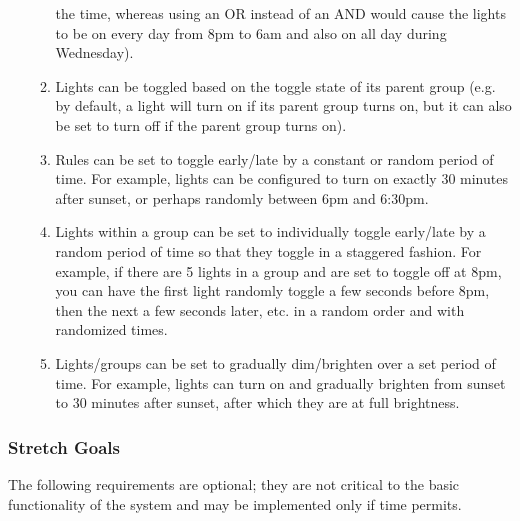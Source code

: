 \begin{enumerate}
\begin{enumerate}
                the time, whereas using an OR instead of an AND would cause the
                lights to be on every day from 8pm to 6am and also on all day
                during Wednesday).
            \item Lights can be toggled based on the toggle state of its parent
                group (e.g. by default, a light will turn on if its parent
                group turns on, but it can also be set to turn off if the
                parent group turns on).
            \item Rules can be set to toggle early/late by a constant or random
                period of time.  For example, lights can be configured to turn
                on exactly 30 minutes after sunset, or perhaps randomly between
                6pm and 6:30pm.
            \item Lights within a group can be set to individually toggle
                early/late by a random period of time so that they toggle in a
                staggered fashion.  For example, if there are 5 lights in a
                group and are set to toggle off at 8pm, you can have the first
                light randomly toggle a few seconds before 8pm, then the next a
                few seconds later, etc. in a random order and with randomized
                times.
            \item Lights/groups can be set to gradually dim/brighten over a set
                period of time.  For example, lights can turn on and gradually
                brighten from sunset to 30 minutes after sunset, after which
                they are at full brightness.
        \end{enumerate}
\end{enumerate}

\subsubsection{Stretch Goals}

The following requirements are optional; they are not critical to the basic
functionality of the system and may be implemented only if time permits.

